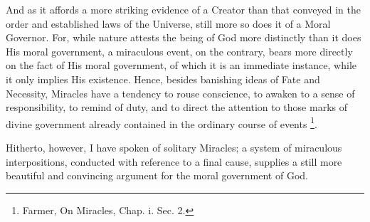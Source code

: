 And as it affords a more striking evidence of a
Creator than that conveyed in the order and established laws of the
Universe, still more so does it of a Moral Governor. For, while nature
attests the being of God more distinctly than it does His moral
government, a miraculous event, on the contrary, bears more directly
on the fact of His moral government, of which it is an immediate
instance, while it only implies His existence. Hence, besides
banishing ideas of Fate and Necessity, Miracles have a tendency to
rouse conscience, to awaken to a sense of responsibility, to remind of
duty, and to direct the attention to those marks of divine government
already contained in the ordinary course of events \footnote{Farmer, On Miracles, Chap. i. Sec. 2.}.

Hitherto, however, I have spoken of solitary
Miracles; a system of miraculous interpositions, conducted with
reference to a final cause, supplies a still more beautiful and
convincing argument for the moral government of God.


